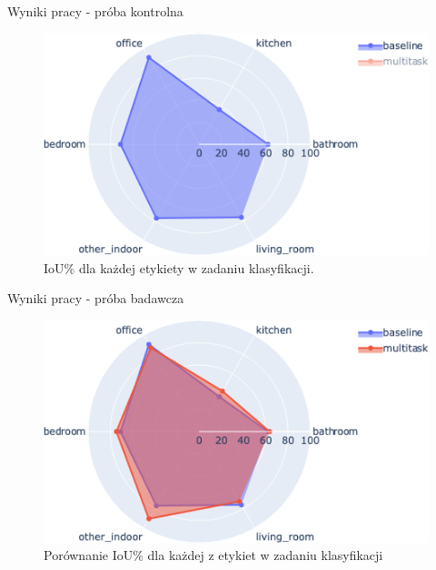 \documentclass[10pt]{beamer}
\begin{document}
\begin{frame}{Wyniki pracy - próba kontrolna}
        
    \begin{figure}
        \includegraphics[width=\textwidth]{images/classification_polar_baseline.png}
        \caption{IoU\% dla każdej etykiety w zadaniu klasyfikacji.}
    \end{figure}
\end{frame}
\begin{frame}{Wyniki pracy - próba badawcza}
    \begin{figure}
        \includegraphics[width=\textwidth]{images/classification_polar.png}
        \caption{Porównanie IoU\% dla każdej z etykiet w zadaniu klasyfikacji}
    \end{figure}
\end{frame}
\end{document}
